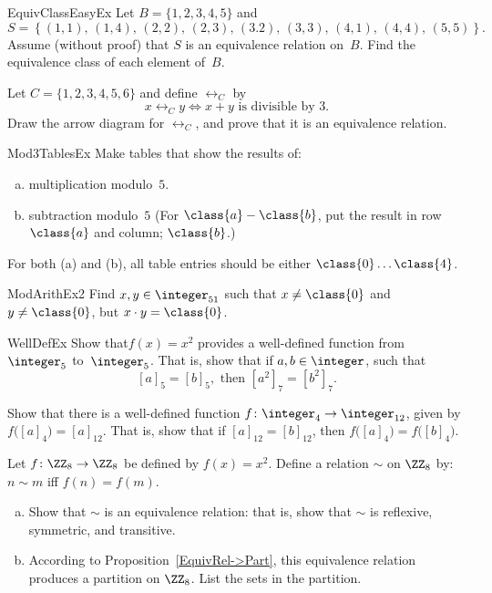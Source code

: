 \begin{exercise}{EquivClassEasyEx}
Let $B = \{1,2,3,4,5\}$ and 
	$$S = \left\{ (1,1),\, (1,4),\, (2,2),\, (2,3),\, (3.2),\, 
		(3,3),\, (4,1),\, (4,4),\, (5,5)
		 \right\} .$$
Assume (without proof) that $S$ is an equivalence relation on~$B$. Find the equivalence class of each element of~$B$.
\end{exercise}

\begin{exercise}{}
Let $C = \{1,2,3,4,5,6\}$ and define $\rel_C$ by 
\[ x \rel_C y \iff x + y \text{ is divisible by 3.} \]
Draw the arrow diagram for $\rel_C$, and prove that it is an equivalence relation.
\end{exercise}

\begin{exercise}{Mod3TablesEx}
Make tables that show the results of:
\begin{enumerate}[(a)]
\item \label{Mod3TablesEx-multiplication}
multiplication modulo~$5$.
\item \label{Mod3TablesEx-subtraction}
subtraction modulo~$5$ (For $\class{a} - \class{b}$,  put the result in row $\class{a}$ and column; $\class{b}$.)
\end{enumerate}
For both (a) and (b), all table entries should be  either $\class{0} \ldots \class{4}$.
\end{exercise}

\begin{exercise}{ModArithEx2}  
Find $x,y \in \integer_{51}$ such that $x \neq \class{0}$ and $y \neq \class{0}$, but $x \cdot y = \class{0}$.
\end{exercise}

\begin{exercise}{WellDefEx}
 Show that$f(x)=x^2$ provides a well-defined function from~$\integer_5$ to~$\integer_5$. That is, show that if $a,b \in \integer$, such that 
\[ [a]_5 = [b]_5, \text{ then } [ a^2]_7 = [ b^2]_7.\]
\end{exercise}

\begin{exercise}{57}
Show that there is a well-defined function 
$f \colon \integer_4 \to \integer_{12}$, given by \\
$ f \bigl( [a]_4 \bigr) = [a]_{12}$. 
That is, show that if $[a]_{12} = [b]_{12}$, then $f \bigl( [a]_4 \bigr) = f \bigl( [b]_4 \bigr)$.
\end{exercise}

\begin{exercise}{66}
Let $f\colon \ZZ_8 \to \ZZ_8$ be defined by $f(x) =  x^2 $. Define a relation $\sim$ on $\ZZ_8$ by: $n \sim m$ iff $f(n) = f(m)$.
\begin{enumerate}[(a)]
\item
Show that $\sim$ is an equivalence relation: that is, show that $\sim$ is reflexive, symmetric, and transitive.
\item
According to Proposition~\ref{EquivRel->Part}, this equivalence relation produces a partition on  $\ZZ_8$. List the sets in the partition.
\end{enumerate}
\end{exercise}

